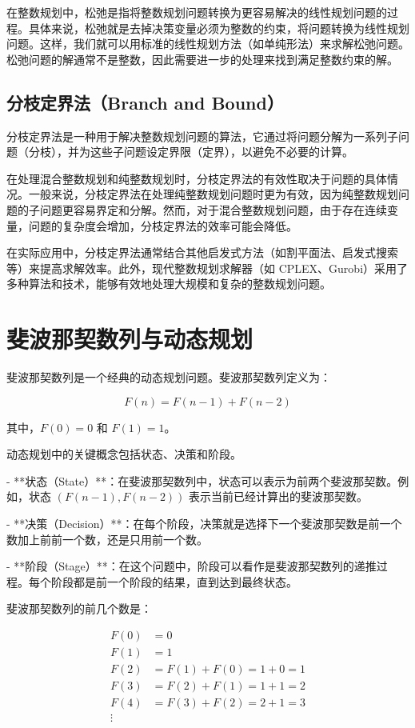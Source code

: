 \documentclass[12pt, a4paper, oneside]{ctexart}
\begin{document}
在整数规划中，松弛是指将整数规划问题转换为更容易解决的线性规划问题的过程。具体来说，松弛就是去掉决策变量必须为整数的约束，将问题转换为线性规划问题。这样，我们就可以用标准的线性规划方法（如单纯形法）来求解松弛问题。松弛问题的解通常不是整数，因此需要进一步的处理来找到满足整数约束的解。

\subsection{分枝定界法（Branch and Bound）}

分枝定界法是一种用于解决整数规划问题的算法，它通过将问题分解为一系列子问题（分枝），并为这些子问题设定界限（定界），以避免不必要的计算。

在处理混合整数规划和纯整数规划时，分枝定界法的有效性取决于问题的具体情况。一般来说，分枝定界法在处理纯整数规划问题时更为有效，因为纯整数规划问题的子问题更容易界定和分解。然而，对于混合整数规划问题，由于存在连续变量，问题的复杂度会增加，分枝定界法的效率可能会降低。

在实际应用中，分枝定界法通常结合其他启发式方法（如割平面法、启发式搜索等）来提高求解效率。此外，现代整数规划求解器（如 CPLEX、Gurobi）采用了多种算法和技术，能够有效地处理大规模和复杂的整数规划问题。

\section{斐波那契数列与动态规划}

斐波那契数列是一个经典的动态规划问题。斐波那契数列定义为：


$$F(n) = F(n-1) + F(n-2)$$


其中，$F(0) = 0$ 和 $F(1) = 1$。

动态规划中的关键概念包括状态、决策和阶段。

- **状态（State）**：在斐波那契数列中，状态可以表示为前两个斐波那契数。例如，状态 $(F(n-1), F(n-2))$ 表示当前已经计算出的斐波那契数。

- **决策（Decision）**：在每个阶段，决策就是选择下一个斐波那契数是前一个数加上前前一个数，还是只用前一个数。

- **阶段（Stage）**：在这个问题中，阶段可以看作是斐波那契数列的递推过程。每个阶段都是前一个阶段的结果，直到达到最终状态。

斐波那契数列的前几个数是：

\begin{align*}
F(0) &= 0 \\
F(1) &= 1 \\
F(2) &= F(1) + F(0) = 1 + 0 = 1 \\
F(3) &= F(2) + F(1) = 1 + 1 = 2 \\
F(4) &= F(3) + F(2) = 2 + 1 = 3 \\
\vdots
\end{align*}
\end{document}
